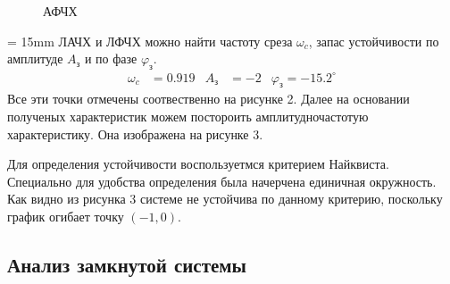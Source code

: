 \documentclass[a4paper, 12pt]{article}
\begin{document}
\newpage
\hspace*{-\parindent}%
\begin{minipage}[t]{0.4\textwidth}
    \vspace{-1cm}
    \begin{figure}[H]
    \centering
    \caption{АФЧХ}
    \end{figure}
\end{minipage}
\begin{minipage}[t]{0.6\textwidth}
    \parindent = 15mm
     ЛАЧХ и ЛФЧХ можно найти частоту среза $\omega_c$, запас устойчивости по амплитуде $A_\text{з}$ и по фазе $\varphi_\text{з}$.
    \begin{align*}
        \omega_c & = 0.919 & A_\text{з} & = -2 & \varphi_\text{з} = -15.2^\circ
    \end{align*}
    Все эти точки отмечены соотвественно на рисунке 2. Далее на основании полученых характеристик можем постороить амплитудночастотую характеристику. Она изображена на рисунке 3. \par
    Для определения устойчивости воспользуетмся критерием Найквиста. Специально для удобства определения была начерчена единичная окружность. Как видно из рисунка 3 системе не устойчива по данному критерию, поскольку график огибает точку $(-1, 0)$.
\end{minipage}

\newpage
\begin{center}
\section{Анализ замкнутой системы}
\end{center} \par
\end{document}
